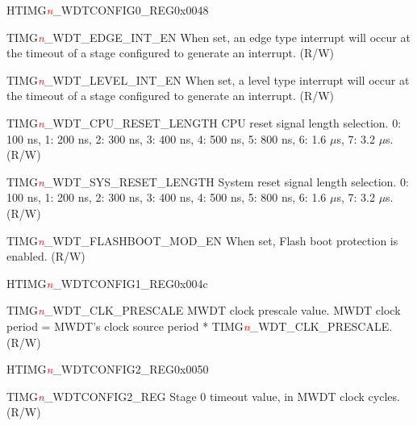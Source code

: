 \begin{register}{H}{TIMG\textcolor{red}{\it{n}}\_WDTCONFIG0\_REG}{0x0048}
\begin{regdesc}
\begin{reglist}
\item [TIMG\textcolor{red}{\it{n}}\_WDT\_EDGE\_INT\_EN]When set, an edge type interrupt will occur at the timeout of a stage configured to generate an interrupt. (R/W)
\item [TIMG\textcolor{red}{\it{n}}\_WDT\_LEVEL\_INT\_EN]When set, a level type interrupt will occur at the timeout of a stage configured to generate an interrupt. (R/W)
\item [TIMG\textcolor{red}{\it{n}}\_WDT\_CPU\_RESET\_LENGTH]CPU reset signal length selection. 0: 100 ns, 1: 200 ns, 2: 300 ns, 3: 400 ns, 4: 500 ns, 5: 800 ns, 6: 1.6 $\mu$s, 7: 3.2 $\mu$s. (R/W)
\item [TIMG\textcolor{red}{\it{n}}\_WDT\_SYS\_RESET\_LENGTH]System reset signal length selection. 0: 100 ns, 1: 200 ns, 2: 300 ns, 3: 400 ns, 4: 500 ns, 5: 800 ns, 6: 1.6 $\mu$s, 7: 3.2 $\mu$s. (R/W)
\item [TIMG\textcolor{red}{\it{n}}\_WDT\_FLASHBOOT\_MOD\_EN]When set, Flash boot protection is enabled. (R/W)
\end{reglist}\end{regdesc}
\end{register}


\begin{register}{H}{TIMG\textcolor{red}{\it{n}}\_WDTCONFIG1\_REG}{0x004c}\label{regdesc:TIMERSWDTCONFIG1REG}
%
%
\regnewline%
\begin{regdesc}\begin{reglist}
\item [TIMG\textcolor{red}{\it{n}}\_WDT\_CLK\_PRESCALE]MWDT clock prescale value. MWDT clock period = MWDT’s clock source period * TIMG\textcolor{red}{\it{n}}\_WDT\_CLK\_PRESCALE. (R/W)
\end{reglist}\end{regdesc}
\end{register}


\begin{register}{H}{TIMG\textcolor{red}{\it{n}}\_WDTCONFIG2\_REG}{0x0050}\label{regdesc:TIMERSWDTCONFIG2REG}
%
\regnewline%
\begin{regdesc}\begin{reglist}
\item [TIMG\textcolor{red}{\it{n}}\_WDTCONFIG2\_REG]Stage 0 timeout value, in MWDT clock cycles. (R/W)
\end{reglist}\end{regdesc}
\end{register}



